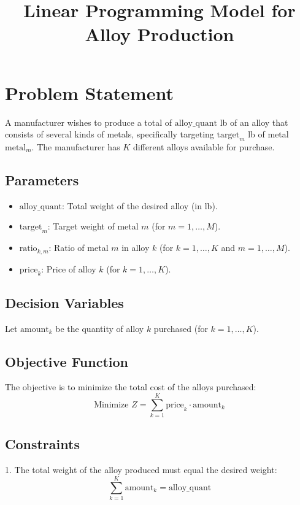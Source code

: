 \documentclass{article}
\begin{document}
\title{Linear Programming Model for Alloy Production}
\author{}
\date{}
\maketitle

\section*{Problem Statement}
A manufacturer wishes to produce a total of \( \text{alloy\_quant} \) lb of an alloy that consists of several kinds of metals, specifically targeting \( \text{target}_{m} \) lb of metal \( \text{metal}_{m} \). The manufacturer has \( K \) different alloys available for purchase.

\subsection*{Parameters}
\begin{itemize}
    \item \( \text{alloy\_quant} \): Total weight of the desired alloy (in lb).
    \item \( \text{target}_{m} \): Target weight of metal \( m \) (for \( m = 1, \ldots, M \)).
    \item \( \text{ratio}_{k,m} \): Ratio of metal \( m \) in alloy \( k \) (for \( k = 1, \ldots, K \) and \( m = 1, \ldots, M \)).
    \item \( \text{price}_{k} \): Price of alloy \( k \) (for \( k = 1, \ldots, K \)).
\end{itemize}

\subsection*{Decision Variables}
Let \( \text{amount}_{k} \) be the quantity of alloy \( k \) purchased (for \( k = 1, \ldots, K \)).

\subsection*{Objective Function}
The objective is to minimize the total cost of the alloys purchased:
\[
\text{Minimize } Z = \sum_{k=1}^{K} \text{price}_{k} \cdot \text{amount}_{k}
\]

\subsection*{Constraints}
1. The total weight of the alloy produced must equal the desired weight:
   \[
   \sum_{k=1}^{K} \text{amount}_{k} = \text{alloy\_quant}
   \]
\end{document}
